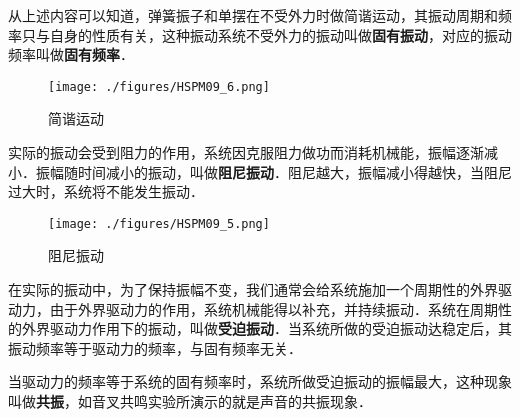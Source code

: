 从上述内容可以知道，弹簧振子和单摆在不受外力时做简谐运动，其振动周期和频率只与自身的性质有关，这种振动系统不受外力的振动叫做\textbf{固有振动}，对应的振动频率叫做\textbf{固有频率}．

\begin{figure}[ht]
\centering
\texttt{[image: ./figures/HSPM09\_6.png]}
\caption{简谐运动} \label{HSPM09_fig6}
\end{figure}


实际的振动会受到阻力的作用，系统因克服阻力做功而消耗机械能，振幅逐渐减小．振幅随时间减小的振动，叫做\textbf{阻尼振动}．阻尼越大，振幅减小得越快，当阻尼过大时，系统将不能发生振动．

\begin{figure}[ht]
\centering
\texttt{[image: ./figures/HSPM09\_5.png]}
\caption{阻尼振动} \label{HSPM09_fig5}
\end{figure}


在实际的振动中，为了保持振幅不变，我们通常会给系统施加一个周期性的外界驱动力，由于外界驱动力的作用，系统机械能得以补充，并持续振动．系统在周期性的外界驱动力作用下的振动，叫做\textbf{受迫振动}．当系统所做的受迫振动达稳定后，其振动频率等于驱动力的频率，与固有频率无关．

当驱动力的频率等于系统的固有频率时，系统所做受迫振动的振幅最大，这种现象叫做\textbf{共振}，如音叉共鸣实验所演示的就是声音的共振现象．

